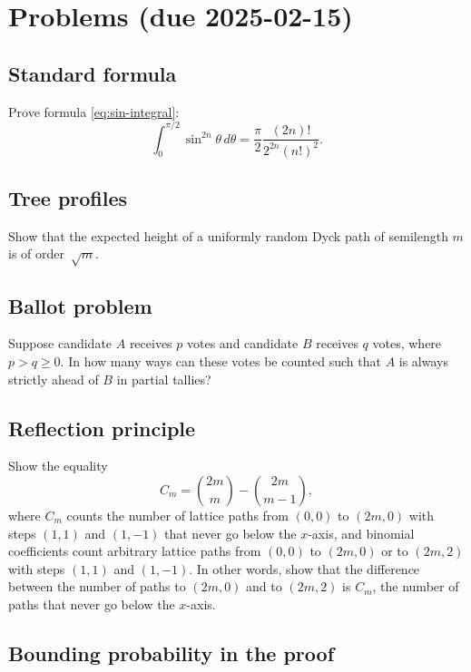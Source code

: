 \documentclass[letterpaper,11pt,oneside,reqno]{article}
\numberwithin{equation}{section}
\theoremstyle{definition}
\begin{document}
\appendix
\setcounter{section}{1}

\section{Problems (due 2025-02-15)}

\subsection{Standard formula}
\label{prob:sin-integral}

Prove formula \eqref{eq:sin-integral}:
\begin{equation*}
	\int_0^{\pi/2} \sin^{2n}\theta\, d\theta = \frac{\pi}{2} \frac{(2n)!}{2^{2n} (n!)^2}.
\end{equation*}


\subsection{Tree profiles}
	Show that the expected height of a uniformly random Dyck path of semilength $m$ is of order~$\sqrt{m}$.

\subsection{Ballot problem}


Suppose candidate \(A\) receives \(p\) votes and candidate \(B\) receives \(q\) votes, where \(p > q \geq 0\). In how many ways can these votes be counted such that \(A\) is always strictly ahead of \(B\) in partial tallies?

\subsection{Reflection principle}
\label{prob:reflection-principle}

Show the equality
\begin{equation*}
	C_m=\binom{2m}{m}-\binom{2m}{m-1},
\end{equation*}
where $C_m$ counts the number of lattice paths
from $(0,0)$ to $(2m,0)$ with steps $(1,1)$ and $(1,-1)$
that never go below the $x$-axis,
and binomial coefficients count
arbitrary lattice paths from $(0,0)$ to $(2m,0)$ or
to $(2m,2)$ with steps $(1,1)$ and $(1,-1)$.
In other words, show that the difference between the number of paths
to $(2m,0)$ and to $(2m,2)$ is $C_m$, the number of paths
that never go below the $x$-axis.

\subsection{Bounding probability in the proof}
\label{prob:chebyshev-like}
\end{document}
